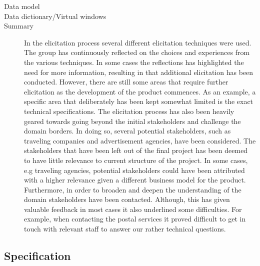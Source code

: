 \documentclass[10pt,a4paper]{article}
\begin{document}
\begin{description}
\item[Data model]

\item[Data dictionary/Virtual windows]

\item[Summary] In the elicitation process several different elicitation techniques were used. The group has continuously reflected on the choices and experiences from the various techniques. In some cases the reflections has highlighted the need for more information, resulting in that additional elicitation has been conducted. However, there are still some areas that require further elicitation as the development of the product commences. As an example, a specific area that deliberately has been kept somewhat limited is the exact technical specifications. 
The elicitation process has also been heavily geared towards going beyond the initial stakeholders and challenge the domain borders. In doing so, several potential stakeholders, such as traveling companies and advertisement agencies, have been considered. The stakeholders that have been left out of the final project has been deemed to have little relevance to current structure of the project. In some cases, e.g traveling agencies, potential stakeholders could have been attributed with a higher relevance given a different business model for the product. Furthermore, in order to broaden and deepen the understanding of the domain stakeholders have been contacted. Although, this has given valuable feedback in most cases it also underlined some difficulties. For example, when contacting the postal services it proved difficult to get in touch with relevant staff to answer our rather technical questions. 

\end{description}


\subsection{Specification}
\end{document}
